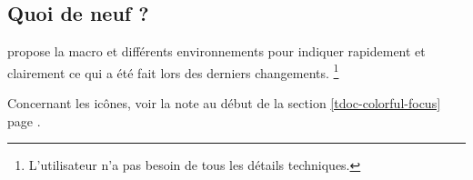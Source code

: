 \documentclass[10pt, a4paper]{article}
\begin{document}
\subsection{Quoi de neuf ?}

\thispack{} propose la macro  et différents environnements pour indiquer rapidement et clairement ce qui a été fait lors des derniers changements.%
\footnote{
    L'utilisateur n'a pas besoin de tous les détails techniques.
}


\begin{tdocnote}
    Concernant les icônes, voir la note au début de la section \ref{tdoc-colorful-focus} page \pageref{tdoc-colorful-focus}.
\end{tdocnote}




\begin{tdocexa}
    \leavevmode

\end{tdocexa}




\begin{tdocexa}
    \leavevmode

\end{tdocexa}




\begin{tdocexa}
    \leavevmode

\end{tdocexa}




\begin{tdocexa}
    \leavevmode

\end{tdocexa}




\begin{tdocexa}
    \leavevmode

\end{tdocexa}
\end{document}

